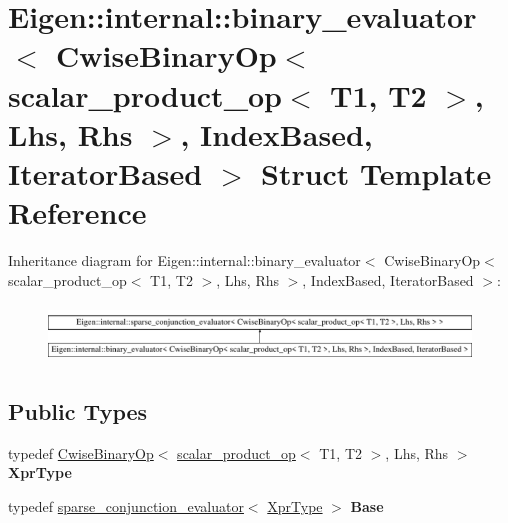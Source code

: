 \hypertarget{struct_eigen_1_1internal_1_1binary__evaluator_3_01_cwise_binary_op_3_01scalar__product__op_3_01_4fbec0bc40906a60ec0172ac23f5103a}{}\section{Eigen\+::internal\+::binary\+\_\+evaluator$<$ Cwise\+Binary\+Op$<$ scalar\+\_\+product\+\_\+op$<$ T1, T2 $>$, Lhs, Rhs $>$, Index\+Based, Iterator\+Based $>$ Struct Template Reference}
\label{struct_eigen_1_1internal_1_1binary__evaluator_3_01_cwise_binary_op_3_01scalar__product__op_3_01_4fbec0bc40906a60ec0172ac23f5103a}
Inheritance diagram for Eigen\+::internal\+::binary\+\_\+evaluator$<$ Cwise\+Binary\+Op$<$ scalar\+\_\+product\+\_\+op$<$ T1, T2 $>$, Lhs, Rhs $>$, Index\+Based, Iterator\+Based $>$\+:\begin{figure}[H]
\begin{center}
\leavevmode
\includegraphics[height=1.551247cm]{struct_eigen_1_1internal_1_1binary__evaluator_3_01_cwise_binary_op_3_01scalar__product__op_3_01_4fbec0bc40906a60ec0172ac23f5103a}
\end{center}
\end{figure}
\subsection*{Public Types}
\begin{DoxyCompactItemize}
\item 
\mbox{\label{struct_eigen_1_1internal_1_1binary__evaluator_3_01_cwise_binary_op_3_01scalar__product__op_3_01_4fbec0bc40906a60ec0172ac23f5103a_ad6164def474d975a66fdec17fab0b0fc}} 
typedef \mbox{\hyperlink{class_eigen_1_1_cwise_binary_op}{Cwise\+Binary\+Op}}$<$ \mbox{\hyperlink{struct_eigen_1_1internal_1_1scalar__product__op}{scalar\+\_\+product\+\_\+op}}$<$ T1, T2 $>$, Lhs, Rhs $>$ {\bfseries Xpr\+Type}
\item 
\mbox{\label{struct_eigen_1_1internal_1_1binary__evaluator_3_01_cwise_binary_op_3_01scalar__product__op_3_01_4fbec0bc40906a60ec0172ac23f5103a_a866273224bc3e4a8eca8da3145acde08}} 
typedef \mbox{\hyperlink{struct_eigen_1_1internal_1_1sparse__conjunction__evaluator}{sparse\+\_\+conjunction\+\_\+evaluator}}$<$ \mbox{\hyperlink{class_eigen_1_1_cwise_binary_op}{Xpr\+Type}} $>$ {\bfseries Base}
\end{DoxyCompactItemize}

